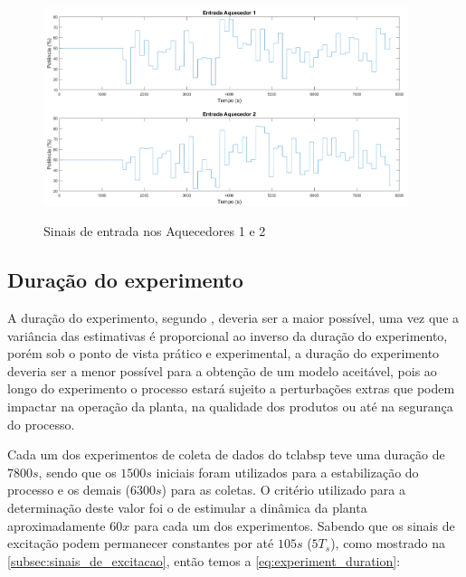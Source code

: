 \begin{figure}[h]
	\caption{Sinais de entrada nos Aquecedores 1 e 2}
	\begin{center}
		\includegraphics[width=0.95\textwidth]{./5_images/inputs_H1H2.png} 
		\label{fig:experiment_inputs}
	\end{center}
	\centering
\end{figure}

\subsection{Duração do experimento}
\label{subsec:duracao_do_experimento}

A duração do experimento, segundo , deveria ser
a maior possível, uma vez que a variância das estimativas é proporcional ao inverso da duração do
experimento, porém sob o ponto de vista prático e experimental, a duração do experimento deveria ser
a menor possível para a obtenção de um modelo aceitável, pois ao longo do experimento o processo
estará sujeito a perturbações extras que podem impactar na operação da planta, na qualidade dos
produtos ou até na segurança do processo.

Cada um dos experimentos de coleta de dados do \acrshort{tclabsp} teve uma duração de $7800s$,
sendo que os $1500s$ iniciais foram utilizados para a estabilização do processo e os demais ($6300s$)
para as coletas. O critério utilizado para a determinação deste valor foi o de estimular a dinâmica
da planta aproximadamente $60x$ para cada um dos experimentos. Sabendo que os sinais de excitação
podem permanecer constantes por até $105s$ ($5T_s$), como mostrado na \cref{subsec:sinais_de_excitacao},
então temos a \cref{eq:experiment_duration}:

